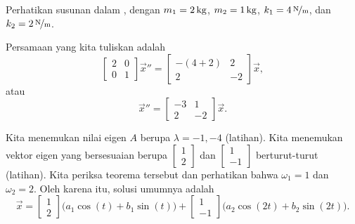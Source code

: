\begin{example}
Perhatikan susunan dalam , dengan
$m_1 = \unit[2]{kg}$, $m_2 = \unit[1]{kg}$, $k_1 = \unitfrac[4]{N}{m}$, dan
$k_2 = \unitfrac[2]{N}{m}$.

\begin{myfig}
\capstart
{}
\caption{Sistem massa dan pegas.\label{sosa:twocartswallfig}}
\end{myfig}

Persamaan yang kita tuliskan adalah
\begin{equation*}
\begin{bmatrix}
2 & 0 \\
0 & 1
\end{bmatrix}
{\vec{x}}'' =
\begin{bmatrix}
-(4+2) & 2 \\
2 & -2
\end{bmatrix}
\vec{x} ,
\end{equation*}
atau
\begin{equation*}
{\vec{x}}'' =
\begin{bmatrix}
-3 & 1 \\
2 & -2
\end{bmatrix}
\vec{x} .
\end{equation*}

Kita menemukan nilai eigen $A$ berupa $\lambda = -1, -4$ (latihan).
Kita menemukan vektor eigen yang bersesuaian berupa
$\left[ \begin{smallmatrix} 1 \\ 2 \end{smallmatrix} \right]$ dan
$\left[ \begin{smallmatrix} 1 \\ -1 \end{smallmatrix} \right]$ berturut-turut
(latihan).
Kita periksa teorema tersebut dan perhatikan bahwa $\omega_1 = 1$ dan $\omega_2 = 2$.
Oleh karena itu, solusi umumnya adalah
\begin{equation*}
\vec{x} = 
\begin{bmatrix} 1 \\ 2 \end{bmatrix}
\bigl( a_1 \cos (t) + b_1 \sin (t) \bigr)
+
\begin{bmatrix} 1 \\ -1 \end{bmatrix}
\bigl( a_2 \cos (2t) + b_2 \sin (2t) \bigr) .
\end{equation*}


\end{example}
